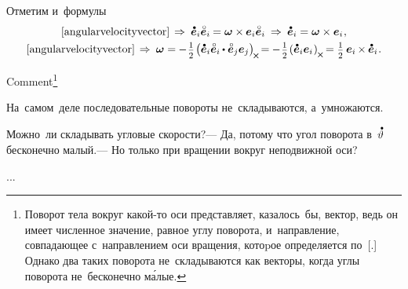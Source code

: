 \begin{otherlanguage}{russian}
\vspace{-0.25em}
Отметим и~формулы
\nopagebreak\vspace{.16em}\begin{equation}\label{angularvelocityandbasisvectors}
\begin{array}{c}
\eqref{angularvelocityvector} \hspace{.32ex} \Rightarrow\:
\mathdotabove{\bm{e}}_i \mathcircabove{\bm{e}}_i \hspace{-0.1ex} = \bm{\omega} \times \hspace{-0.1ex} \bm{e}_i \mathcircabove{\bm{e}}_i \:\Rightarrow\:
\mathdotabove{\bm{e}}_i = \bm{\omega} \times \bm{e}_i \hspace{0.12ex}, \\[.32em]
%
\eqref{angularvelocityvector} \hspace{.32ex} \Rightarrow\:
\bm{\omega} = \hspace{-0.1ex} - \hspace{0.16ex} \smalldisplaystyleonehalf \hspace{-.2ex} \left( \mathdotabove{\bm{e}}_i \mathcircabove{\bm{e}}_i \hspace{-0.1ex} \dotp \mathcircabove{\bm{e}}_j \bm{e}_j \right)_{\hspace{-0.25ex}\Xcompanion} \hspace{-0.32ex}
= \hspace{-0.1ex} - \hspace{0.16ex} \smalldisplaystyleonehalf \hspace{-.2ex} \left( \mathdotabove{\bm{e}}_i \bm{e}_i \hspace{.1ex} \right)_{\hspace{-0.1ex}\Xcompanion} \hspace{-0.25ex}
= \smalldisplaystyleonehalf \hspace{0.4ex} \bm{e}_i \hspace{-0.16ex} \times \hspace{-0.1ex} \mathdotabove{\bm{e}}_i \hspace{0.12ex}.
\end{array}
\end{equation}



Comment\footnote{Поворот тела вокруг какой\hbox{-}то оси представляет, казалось~бы, вектор, ведь он имеет численное значение, равное углу поворота, и~направление, совпадающее с~направлением оси вращения, котоpое определяется по~[.] Однако два таких поворота не~складываются как векторы, когда углы поворота не~бесконечно м\'{а}лые.}

На~самом~деле последовательные повороты не~складываются, а~умножаются.

Можно~ли складывать угловые скорости?\:--- Да, потому что угол поворота в~$\mathdotabove{\vartheta}$ бесконечно малый.\:--- Но только при вращении вокруг неподвижной оси?

...



\end{otherlanguage}

